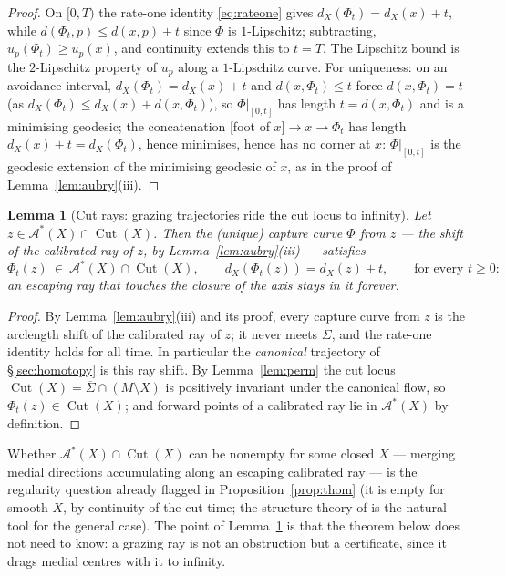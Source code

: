 \documentclass[11pt]{article}
\newtheorem{lemma}[theorem]{Lemma}
\theoremstyle{remark}
\newcommand{\X}{X}
\newcommand{\dX}{d_{\X}}
\newcommand{\Cut}{\operatorname{Cut}}
\newcommand{\Aub}{\mathcal{A}^{\ast}}
\begin{document}
\begin{proof}
On $[0,T)$ the rate-one identity \eqref{eq:rateone} gives
$\dX(\Phi_{t})=\dX(x)+t$, while $d(\Phi_{t},p)\le d(x,p)+t$ since
$\Phi$ is $1$-Lipschitz; subtracting, $u_{p}(\Phi_{t})\ge u_{p}(x)$,
and continuity extends this to $t=T$. The Lipschitz bound is the
$2$-Lipschitz property of $u_{p}$ along a $1$-Lipschitz curve. For
uniqueness: on an avoidance interval,
$\dX(\Phi_{t})=\dX(x)+t$ and $d(x,\Phi_{t})\le t$ force
$d(x,\Phi_{t})=t$ (as $\dX(\Phi_{t})\le\dX(x)+d(x,\Phi_{t})$), so
$\Phi|_{[0,t]}$ has length $t=d(x,\Phi_{t})$ and is a minimising
geodesic; the concatenation [foot of $x$]$\to x\to\Phi_{t}$ has
length $\dX(x)+t=\dX(\Phi_{t})$, hence minimises, hence has no
corner at $x$: $\Phi|_{[0,t]}$ is the geodesic extension of the
minimising geodesic of $x$, as in the proof of
Lemma~\ref{lem:aubry}(iii).
\end{proof}

\begin{lemma}[Cut rays: grazing trajectories ride the cut locus to
infinity]\label{lem:cutray}
Let $z\in\Aub(\X)\cap\Cut(\X)$. Then the (unique) capture curve
$\Phi$ from $z$ --- the shift of the calibrated ray of $z$, by
Lemma~\ref{lem:aubry}(iii) --- satisfies
\[
  \Phi_{t}(z)\ \in\ \Aub(\X)\cap\Cut(\X),\qquad
  \dX(\Phi_{t}(z))=\dX(z)+t ,
  \qquad\text{for every }t\ge0 :
\]
an escaping ray that touches the closure of the axis stays in it
forever.
\end{lemma}

\begin{proof}
By Lemma~\ref{lem:aubry}(iii) and its proof, every capture curve
from $z$ is the arclength shift of the calibrated ray of $z$; it
never meets $\Sigma$, and the rate-one identity holds for all time.
In particular the \emph{canonical} trajectory of
\S\ref{sec:homotopy} is this ray shift. By
Lemma~\ref{lem:perm} the cut locus
$\Cut(\X)=\overline{\Sigma}\cap(M\setminus\X)$ is positively
invariant under the canonical flow, so $\Phi_{t}(z)\in\Cut(\X)$; and
forward points of a calibrated ray lie in $\Aub(\X)$ by definition.
\end{proof}

Whether $\Aub(\X)\cap\Cut(\X)$ can be nonempty for some closed $\X$
--- merging medial directions accumulating along an escaping
calibrated ray --- is the regularity question already flagged in
Proposition~\ref{prop:thom} (it is empty for smooth $\X$, by
continuity of the cut time; the structure theory of \cite{TS,MT} is
the natural tool for the general case). The point of
Lemma~\ref{lem:cutray} is that the theorem below does not need to
know: a grazing ray is not an obstruction but a certificate, since
it drags medial centres with it to infinity.
\end{document}
